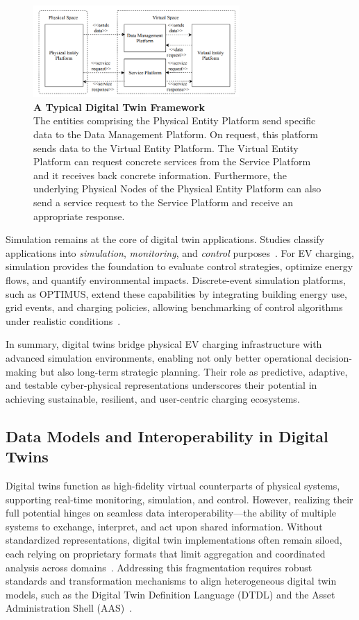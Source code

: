 \begin{figure}[ht!]
    \centering
    \includegraphics[width=0.7\textwidth]{Images/DT_diagram.png}
    \caption{\textbf{A Typical Digital Twin Framework}~\cite{8823809} \\
    The entities comprising the Physical Entity Platform send
specific data to the Data Management Platform. On request,
this platform sends data to the Virtual Entity Platform. The
Virtual Entity Platform can request concrete services from the
Service Platform and it receives back concrete information.
Furthermore, the underlying Physical Nodes of the Physical
Entity Platform can also send a service request to the Service
Platform and receive an appropriate response.
}
    \label{fig:DT_diagram}
\end{figure}


Simulation remains at the core of digital twin applications. Studies 
classify applications into \emph{simulation}, \emph{monitoring}, and 
\emph{control} purposes~\cite{Enders2019}. For EV charging, simulation 
provides the foundation to evaluate control strategies, optimize energy 
flows, and quantify environmental impacts. Discrete-event simulation 
platforms, such as OPTIMUS, extend these capabilities by integrating 
building energy use, grid events, and charging policies, allowing 
benchmarking of control algorithms under realistic conditions~\cite{Talusan2024}. 

In summary, digital twins bridge physical EV charging infrastructure 
with advanced simulation environments, enabling not only better 
operational decision-making but also long-term strategic planning. 
Their role as predictive, adaptive, and testable cyber-physical 
representations underscores their potential in achieving sustainable, 
resilient, and user-centric charging ecosystems.

\subsection{Data Models and Interoperability in Digital Twins}

Digital twins function as high-fidelity virtual counterparts of physical systems, supporting real-time monitoring, simulation, and control. However, realizing their full potential hinges on seamless data interoperability—the ability of multiple systems to exchange, interpret, and act upon shared information. Without standardized representations, digital twin implementations often remain siloed, each relying on proprietary formats that limit aggregation and coordinated analysis across domains~\cite{David2024}. Addressing this fragmentation requires robust standards and transformation mechanisms to align heterogeneous digital twin models, such as the Digital Twin Definition Language (DTDL) and the Asset Administration Shell (AAS)~\cite{Schmidt2023}.

